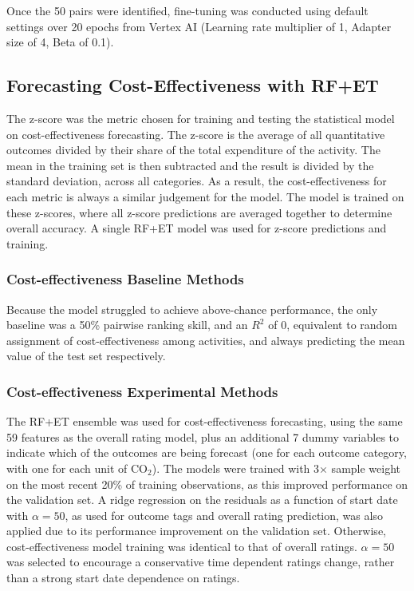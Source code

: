 \documentclass[12pt,a4paper]{article}
\begin{document}
Once the 50 pairs were identified, fine-tuning was conducted using default settings over 20 epochs from Vertex AI (Learning rate multiplier of 1, Adapter size of 4, Beta of 0.1).

\subsection{Forecasting Cost-Effectiveness with RF+ET}
The z-score was the metric chosen for training and testing the statistical model on cost-effectiveness forecasting. The z-score is the average of all quantitative outcomes divided by their share of the total expenditure of the activity. The mean in the training set is then subtracted and the result is divided by the standard deviation, across all categories. As a result, the cost-effectiveness for each metric is always a similar judgement for the model. The model is trained on these z-scores, where all z-score predictions are averaged together to determine overall accuracy. A single RF+ET model was used for z-score predictions and training.

\subsubsection{Cost-effectiveness Baseline Methods}
Because the model struggled to achieve above-chance performance, the only baseline was a 50\% pairwise ranking skill, and an $R^2$ of 0, equivalent to random assignment of cost-effectiveness among activities, and always predicting the mean value of the test set respectively. 

\subsubsection{Cost-effectiveness Experimental Methods}
The RF+ET ensemble was used for cost-effectiveness forecasting, using the same 59 features as the overall rating model, plus an additional 7 dummy variables to indicate which of the outcomes are being forecast (one for each outcome category, with one for each unit of CO$_2$). The models were trained with 3$\times$ sample weight on the most recent 20\% of training observations, as this improved performance on the validation set. A ridge regression on the residuals as a function of start date with $\alpha=50$, as used for outcome tags and overall rating prediction, was also applied due to its performance improvement on the validation set. Otherwise, cost-effectiveness model training was identical to that of overall ratings. $\alpha=50$ was selected to encourage a conservative time dependent ratings change, rather than a strong start date dependence on ratings.
\end{document}

